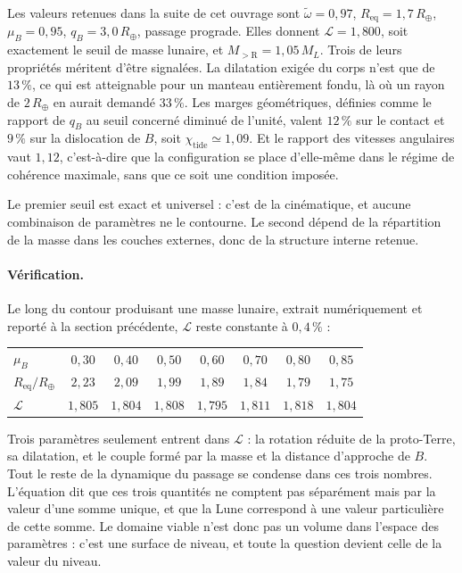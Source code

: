 \documentclass[11pt,a4paper,openany]{report}
\newcommand{\Rt}{R_{\oplus}}
\newcommand{\Req}{R_{\mathrm{eq}}}
\begin{document}
\begin{ideephys}
Les valeurs retenues dans la suite de cet ouvrage sont
$\tilde\omega=0{,}97$, $\Req=1{,}7\,\Rt$, $\mu_B=0{,}95$, $q_B=3{,}0\,\Rt$, passage prograde. Elles
donnent $\mathcal{L}=1{,}800$, soit exactement le seuil de masse lunaire, et
$M_{>\mathrm{R}}=1{,}05\,M_L$. Trois de leurs propriétés méritent d'être signalées. La dilatation
exigée du corps n'est que de $13\,\%$, ce qui est atteignable pour un manteau entièrement fondu,
là où un rayon de $2\,\Rt$ en aurait demandé $33\,\%$. Les marges géométriques, définies comme le rapport de $q_B$ au seuil concerné diminué de l'unité,
valent $12\,\%$ sur le contact et $9\,\%$ sur la dislocation de $B$, soit
$\chi_{\mathrm{tide}}\simeq1{,}09$. Et le rapport des
vitesses angulaires vaut $1{,}12$, c'est-à-dire que la configuration se place d'elle-même dans le
régime de cohérence maximale, sans que ce soit une condition imposée.
\end{ideephys}

Le premier seuil est exact et universel : c'est de la cinématique, et aucune combinaison de
paramètres ne le contourne. Le second dépend de la répartition de la masse dans les couches
externes, donc de la structure interne retenue.

\paragraph{Vérification.} Le long du contour produisant une masse lunaire, extrait numériquement
et reporté à la section précédente, $\mathcal{L}$ reste constante à $0{,}4\,\%$ :

\begin{center}
\begin{tabular}{lccccccc}
\toprule
$\mu_B$ & $0{,}30$ & $0{,}40$ & $0{,}50$ & $0{,}60$ & $0{,}70$ & $0{,}80$ & $0{,}85$ \\
$\Req/\Rt$ & $2{,}23$ & $2{,}09$ & $1{,}99$ & $1{,}89$ & $1{,}84$ & $1{,}79$ & $1{,}75$ \\
$\mathcal{L}$ & $1{,}805$ & $1{,}804$ & $1{,}808$ & $1{,}795$ & $1{,}811$ & $1{,}818$ & $1{,}804$ \\
\bottomrule
\end{tabular}
\end{center}

\begin{ideephys}
Trois paramètres seulement entrent dans $\mathcal{L}$ : la rotation réduite de la proto-Terre, sa
dilatation, et le couple formé par la masse et la distance d'approche de $B$. Tout le reste de la
dynamique du passage se condense dans ces trois nombres. L'équation dit que ces trois quantités ne
comptent pas séparément mais par la valeur d'une somme unique, et que la Lune correspond à une
valeur particulière de cette somme. Le domaine viable n'est donc pas un volume dans l'espace des
paramètres : c'est une surface de niveau, et toute la question devient celle de la valeur du
niveau.
\end{ideephys}
\end{document}
